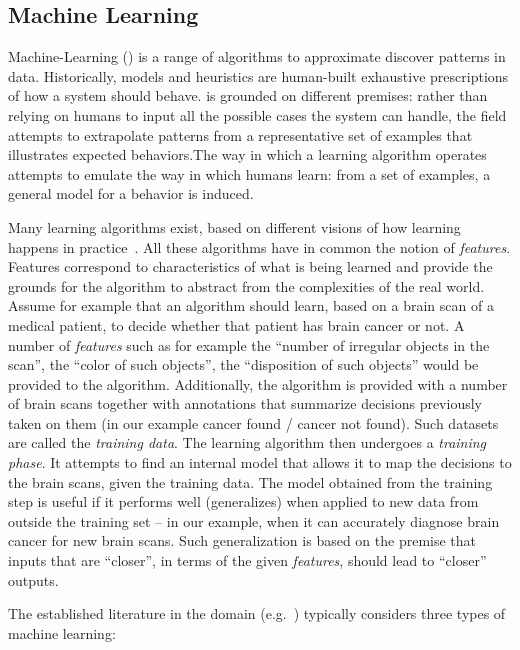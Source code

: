 \subsection{Machine Learning}

Machine-Learning (\ML) \cite{mitchell:1997} is a range of algorithms to
approximate discover patterns in data. Historically, models and heuristics are
human-built exhaustive prescriptions of how a system should behave. \ML is grounded on different premises:
rather than relying on humans to input all the possible cases the system can
handle, the field attempts to extrapolate patterns from a representative
set of examples that illustrates expected behaviors.The way in which a
learning algorithm operates attempts to emulate the way in which humans learn:
from a set of examples, a general model for a behavior is induced.

Many learning algorithms exist, based on different visions of how learning
happens in practice~\cite{Domingos:2015}. All these algorithms have in common
the notion of \emph{features}. Features correspond to characteristics of what is
being learned and provide the grounds for the algorithm to abstract from the
complexities of the real world. Assume for example that an algorithm should
learn, based on a brain scan of a medical patient, to decide whether that
patient has brain cancer or not. A number of \emph{features} such as for example
the ``number of irregular objects in the scan'', the ``color of such objects'',
the ``disposition of such objects'' would be provided to the algorithm.
Additionally, the algorithm is provided with a number of brain scans together
with annotations that summarize decisions previously taken on them (in our
example cancer found / cancer not found). Such datasets are called the
\emph{training data}.
The learning algorithm then undergoes a \emph{training phase}. It attempts to
find an internal model that allows it to map the decisions to the brain scans,
given the training data. The model obtained from the training step is useful if
it performs well (generalizes) when applied to new data from outside the training
set -- in our example, when it can accurately diagnose brain cancer for new
brain scans. Such generalization is based on the premise that inputs that are
``closer'', in terms of the given \emph{features}, should lead to ``closer''
outputs.

The established literature in the domain (e.g.~\cite{mitchell:1997}) typically
considers three types of machine learning:

